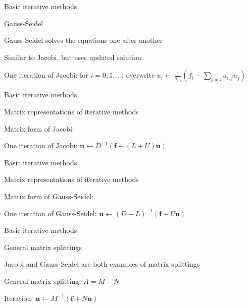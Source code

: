 \documentclass[18pt,xcolor=table]{beamer}
\begin{document}
\begin{frame}{Basic iterative methods}
\begin{block}{Gauss-Seidel}
\bit
\item Gauss-Seidel solves the equations one after another
\item Similar to Jacobi, but uses updated solution
\item One iteration of Jacobi: for $i = 0,1,...$, overwrite $u_i \leftarrow \frac{1}{a_{i,i}} (f_i - \sum_{j\neq i} a_{i,j}u_j)$
\eit
\end{block}
\end{frame}

\begin{frame}{Basic iterative methods}
\begin{block}{Matrix representations of iterative methods}
\bit
\item Matrix form of Jacobi:
\eit
{}
\bit
\item One iteration of Jacobi: $\mathbf{u} \leftarrow D^{-1}(\mathbf{f} + (L+U)\mathbf{u})$
\eit
\end{block}
\end{frame}

\begin{frame}{Basic iterative methods}
\begin{block}{Matrix representations of iterative methods}
\bit
\item Matrix form of Gauss-Seidel:
\eit
{}
\bit
\item One iteration of Gauss-Seidel: $\mathbf{u} \leftarrow (D-L)^{-1}(\mathbf{f} + U\mathbf{u})$
\eit
\end{block}
\end{frame}

\begin{frame}{Basic iterative methods}
\begin{block}{General matrix splittings}
\bit
\item Jacobi and Gauss-Seidel are both examples of matrix splittings
\item General matrix splitting: $A = M - N$
\item Iteration: $\mathbf{u} \leftarrow M^{-1}(\mathbf{f} + N\mathbf{u})$
\eit
\end{block}
\end{frame}
\end{document}
